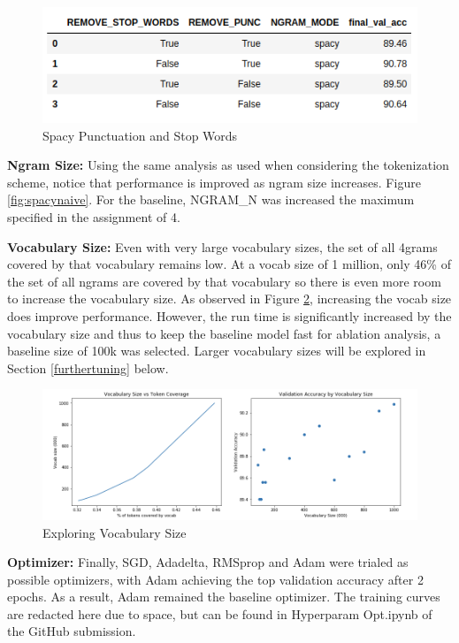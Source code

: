 \documentclass[a4paper,10pt]{article}
\begin{document}
\begin{figure}[h]
    \centering
    \includegraphics[scale=0.4]{spacyoptions}
    \caption{Spacy Punctuation and Stop Words}
    \label{fig:spacyoptions}
\end{figure}

\par
\justify
\textbf{Ngram Size:} Using the same analysis as used when considering the tokenization scheme, notice that performance is improved as ngram size increases. Figure \ref{fig:spacynaive}. For the baseline, NGRAM\_N was increased the maximum specified in the assignment of 4.

\par
\justify
\textbf{Vocabulary Size:} Even with very large vocabulary sizes, the set of all 4grams covered by that vocabulary remains low. At a vocab size of 1 million, only 46\% of the set of all ngrams are covered by that vocabulary so there is even more room to increase the vocabulary size. As observed in Figure \ref{fig:vocabsize}, increasing the vocab size does improve performance. However, the run time is significantly increased by the vocabulary size and thus to keep the baseline model fast for ablation analysis, a baseline size of 100k was selected. Larger vocabulary sizes will be explored in Section \ref{furthertuning} below.


\begin{figure}[h]
    \centering
    \includegraphics[scale=0.3]{vocabsize}
    \caption{Exploring Vocabulary Size}
    \label{fig:vocabsize}
\end{figure}

\par
\justify
\textbf{Optimizer:} Finally, SGD, Adadelta, RMSprop and Adam were trialed as possible optimizers, with Adam achieving the top validation accuracy after 2 epochs. As a result, Adam remained the baseline optimizer. The training curves are redacted here due to space, but can be found in Hyperparam Opt.ipynb of the GitHub submission.
\end{document}
